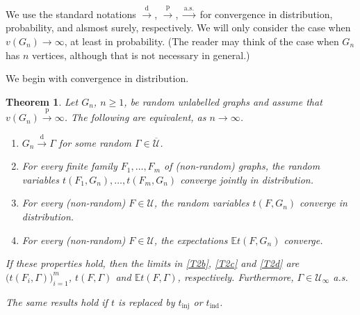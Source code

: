 \documentclass[11pt,reqno,tbtags]{amsart}
\numberwithin{equation}{section}
\newtheorem{theorem}{Theorem}[section]
\theoremstyle{definition}
\theoremstyle{remark}
\newenvironment{romenumerate}{\begin{enumerate}%
 \renewcommand{\labelenumi}{\textup{(\roman{enumi})}}%
 \renewcommand{\theenumi}{\textup{(\roman{enumi})}}%
 }{\end{enumerate}}
\newcommand\bigpar[1]{\bigl(#1\bigr)}
\newcommand\ntoo{\ensuremath{{n\to\infty}}}
\newcommand{\tend}{\longrightarrow}
\newcommand\dto{\overset{\mathrm{d}}{\tend}}
\newcommand\pto{\overset{\mathrm{p}}{\tend}}
\newcommand\asto{\overset{\mathrm{a.s.}}{\tend}}
\newcommand\E{\operatorname{\mathbb E{}}}
\newcommand\gG{\Gamma}
\newcommand\cU{{\mathcal U}}
\renewcommand{\=}{:=}
\newcommand{\tinj}{t_{\mathrm{inj}}}
\newcommand{\tind}{t_{\mathrm{ind}}}
\newcommand{\cuq}{\overline{\cU}}
\newcommand{\cuoo}{\cU_\infty}
\begin{document}
We use the standard notations $\dto$, $\pto$, $\asto$ for convergence
in distribution, probability, and alsmost surely, respectively.
We will only consider the case when $v(G_n)\to\infty$, at least in
probability. (The reader may think of the case when $G_n$ has $n$
vertices, although that is not necessary in general.)

We begin with convergence in distribution.

\begin{theorem}
  \label{T2}
Let $G_n$, $n\ge1$, be random unlabelled graphs and assume that
$v(G_n)\pto\infty$.
The following are equivalent, as \ntoo.
\begin{romenumerate}
  \item\label{T2a}
$G_n\dto \gG$ for some random $\gG\in\cuq$.
  \item\label{T2b}
For every finite family $F_1,\dots,F_m$ of (non-random) graphs, the
random variables $t(F_1,G_n),\dots,t(F_m,G_n)$ converge jointly in
distribution. 
  \item\label{T2c}
For every (non-random) $F\in\cU$, the
random variables $t(F,G_n)$ converge in
distribution.
  \item\label{T2d}
For every (non-random) $F\in\cU$, the
expectations $\E t(F,G_n)$ converge.
\end{romenumerate}
If these properties hold, then the limits in \ref{T2b},
\ref{T2c} and \ref{T2d} are $\bigpar{t(F_i,\gG)}_{i=1}^m$, $t(F,\gG)$ and
$\E t(F,\gG)$, respectively. 
Furthermore, $\gG\in\cuoo$ a.s.

The same results hold if $t$ is replaced by $\tinj$ or $\tind$.
\end{theorem}
\end{document}
